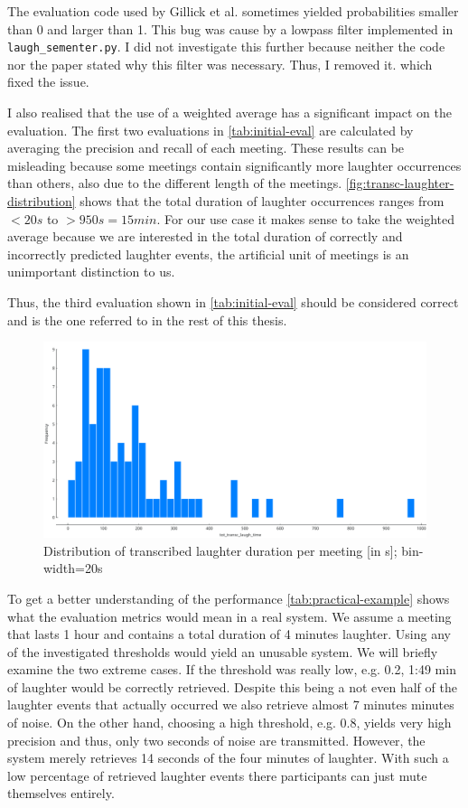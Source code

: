 \documentclass[bsc,frontabs,parskip,deptreport]{infthesis}
\begin{document}
The evaluation code used by Gillick et al. sometimes yielded probabilities smaller than 0 and larger than 1. 
This bug was cause by a lowpass filter implemented in \verb|laugh_sementer.py|. I did not investigate this further because neither the code nor the paper stated why this filter was necessary. Thus, I removed it. which fixed the issue.

I also realised that the use of a weighted average has a significant impact on the evaluation. The first two evaluations in \autoref{tab:initial-eval} are calculated by averaging the precision and recall of each meeting.
These results can be misleading because some meetings contain significantly more laughter occurrences than others, also due to the different length of the meetings. \autoref{fig:transc-laughter-distribution} shows that the total duration of laughter occurrences ranges from $<20s$ to $>950s=15min$.
For our use case it makes sense to take the weighted average because we are interested in the total duration of correctly and incorrectly predicted laughter events, the artificial unit of meetings is an unimportant distinction to us.

Thus, the third evaluation shown in \autoref{tab:initial-eval} should be considered correct and is the one referred to in the rest of this thesis.

\begin{figure}
    \centering
    \includegraphics[width=13cm]{imgs/distributions/transcribed_laughter_time_distribution.png}
    \caption{Distribution of transcribed laughter duration per meeting [in s]; bin-width=20s}
    \label{fig:transc-laughter-distribution}
\end{figure}

To get a better understanding of the performance \autoref{tab:practical-example} shows what the evaluation metrics would mean in a real system. We assume a meeting that lasts 1 hour and contains a total duration of 4 minutes laughter. 
Using any of the investigated thresholds would yield an unusable system.
We will briefly examine the two extreme cases. If the threshold was really low, e.g. 0.2, 1:49 min of laughter would be correctly retrieved. Despite this being a not even half of the laughter events that actually occurred we also retrieve almost 7 minutes minutes of noise.  
On the other hand, choosing a high threshold, e.g. 0.8, yields very high precision and thus, only two seconds of noise are transmitted. However, the system merely retrieves 14 seconds of the four minutes of laughter. With such a low percentage of retrieved laughter events there participants can just mute themselves entirely. 
\end{document}
